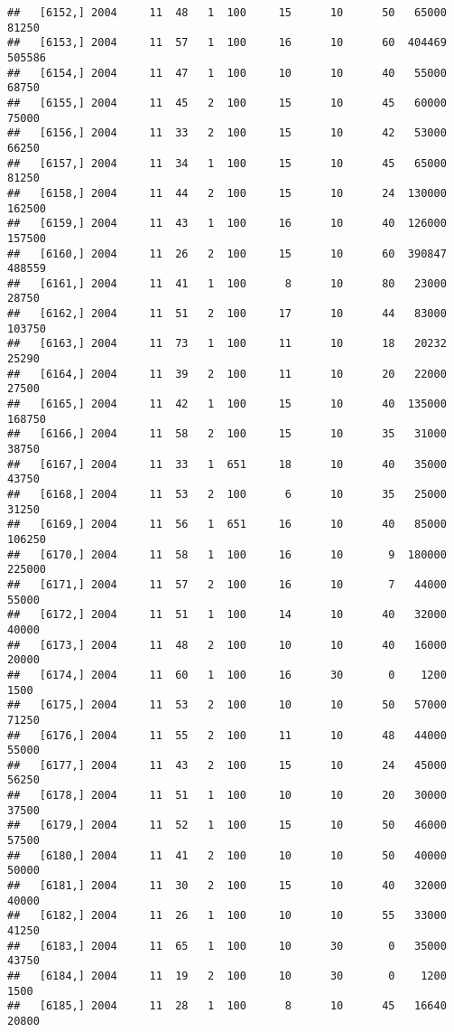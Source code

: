 \documentclass{article}\usepackage[]{graphicx}\usepackage[]{color}
\makeatletter
\newenvironment{kframe}{%
 \def\at@end@of@kframe{}%
 \ifinner\ifhmode%
  \def\at@end@of@kframe{\end{minipage}}%
  \begin{minipage}{\columnwidth}%
 \fi\fi%
 \def\FrameCommand##1{\hskip\@totalleftmargin \hskip-\fboxsep
 \colorbox{shadecolor}{##1}\hskip-\fboxsep
     \hskip-\linewidth \hskip-\@totalleftmargin \hskip\columnwidth}%
 \MakeFramed {\advance\hsize-\width
   \@totalleftmargin\z@ \linewidth\hsize
   \@setminipage}}%
 {\par\unskip\endMakeFramed%
 \at@end@of@kframe}
\newenvironment{knitrout}{}{} %
\makeatother
\begin{document}
\begin{knitrout}
\begin{kframe}
\begin{verbatim}
##   [6152,] 2004     11  48   1  100     15      10      50   65000   81250
##   [6153,] 2004     11  57   1  100     16      10      60  404469  505586
##   [6154,] 2004     11  47   1  100     10      10      40   55000   68750
##   [6155,] 2004     11  45   2  100     15      10      45   60000   75000
##   [6156,] 2004     11  33   2  100     15      10      42   53000   66250
##   [6157,] 2004     11  34   1  100     15      10      45   65000   81250
##   [6158,] 2004     11  44   2  100     15      10      24  130000  162500
##   [6159,] 2004     11  43   1  100     16      10      40  126000  157500
##   [6160,] 2004     11  26   2  100     15      10      60  390847  488559
##   [6161,] 2004     11  41   1  100      8      10      80   23000   28750
##   [6162,] 2004     11  51   2  100     17      10      44   83000  103750
##   [6163,] 2004     11  73   1  100     11      10      18   20232   25290
##   [6164,] 2004     11  39   2  100     11      10      20   22000   27500
##   [6165,] 2004     11  42   1  100     15      10      40  135000  168750
##   [6166,] 2004     11  58   2  100     15      10      35   31000   38750
##   [6167,] 2004     11  33   1  651     18      10      40   35000   43750
##   [6168,] 2004     11  53   2  100      6      10      35   25000   31250
##   [6169,] 2004     11  56   1  651     16      10      40   85000  106250
##   [6170,] 2004     11  58   1  100     16      10       9  180000  225000
##   [6171,] 2004     11  57   2  100     16      10       7   44000   55000
##   [6172,] 2004     11  51   1  100     14      10      40   32000   40000
##   [6173,] 2004     11  48   2  100     10      10      40   16000   20000
##   [6174,] 2004     11  60   1  100     16      30       0    1200    1500
##   [6175,] 2004     11  53   2  100     10      10      50   57000   71250
##   [6176,] 2004     11  55   2  100     11      10      48   44000   55000
##   [6177,] 2004     11  43   2  100     15      10      24   45000   56250
##   [6178,] 2004     11  51   1  100     10      10      20   30000   37500
##   [6179,] 2004     11  52   1  100     15      10      50   46000   57500
##   [6180,] 2004     11  41   2  100     10      10      50   40000   50000
##   [6181,] 2004     11  30   2  100     15      10      40   32000   40000
##   [6182,] 2004     11  26   1  100     10      10      55   33000   41250
##   [6183,] 2004     11  65   1  100     10      30       0   35000   43750
##   [6184,] 2004     11  19   2  100     10      30       0    1200    1500
##   [6185,] 2004     11  28   1  100      8      10      45   16640   20800

\end{verbatim}
\end{kframe}
\end{knitrout}
\end{document}
